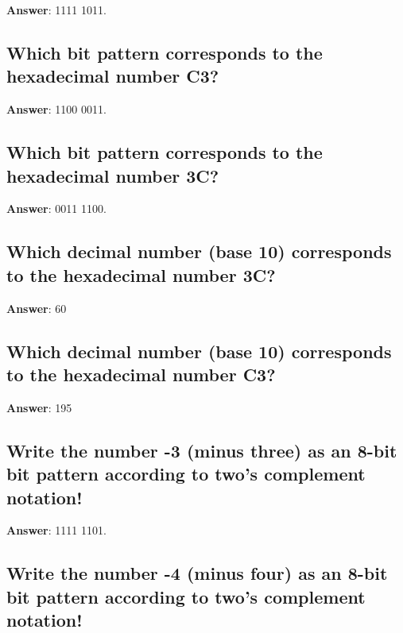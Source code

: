 \documentclass[a4paper,11pt,oneside]{article}
\begin{document}
\begin{sloppypar}
\label{q:387:sa:en:True}

\textbf{Answer}: 1111 1011.



\subsection{Which bit pattern corresponds to the hexadecimal number C3?}

\label{q:388:sa:en:True}

\textbf{Answer}: 1100 0011.



\subsection{Which bit pattern corresponds to the hexadecimal number 3C?}

\label{q:389:sa:en:True}

\textbf{Answer}: 0011 1100.



\subsection{Which decimal number (base 10) corresponds to the hexadecimal number 3C?}

\label{q:390:sa:en:True}

\textbf{Answer}: 60



\subsection{Which decimal number (base 10) corresponds to the hexadecimal number C3?}

\label{q:391:sa:en:True}

\textbf{Answer}: 195



\subsection{Write the number -3 (minus three) as an 8-bit bit pattern according to two's complement notation!}

\label{q:392:sa:en:True}

\textbf{Answer}: 1111 1101.



\subsection{Write the number -4 (minus four) as an 8-bit bit pattern according to two's complement notation!}


\end{sloppypar}
\end{document}
